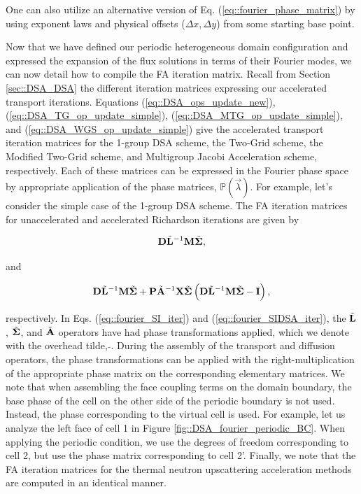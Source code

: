 \noindent One can also utilize an alternative version of Eq. (\ref{eq::fourier_phase_matrix}) by using exponent laws and physical offsets ($\Delta x, \Delta y$) from some starting base point.

Now that we have defined our periodic heterogeneous domain configuration and expressed the expansion of the flux solutions in terms of their Fourier modes, we can now detail how to compile the FA iteration matrix. Recall from Section \ref{sec::DSA_DSA} the different iteration matrices expressing our accelerated transport iterations. Equations (\ref{eq::DSA_ops_update_new}), (\ref{eq::DSA_TG_op_update_simple}), (\ref{eq::DSA_MTG_op_update_simple}), and (\ref{eq::DSA_WGS_op_update_simple}) give the accelerated transport iteration matrices for the 1-group DSA scheme, the Two-Grid scheme, the Modified Two-Grid scheme, and Multigroup Jacobi Acceleration scheme, respectively. Each of these matrices can be expressed in the Fourier phase space by appropriate application of the phase matrices, $\mathbb{P} (\vec{\lambda}) $. For example, let's consider the simple case of the 1-group DSA scheme. The FA iteration matrices for unaccelerated and accelerated Richardson iterations are given by

\begin{equation}
\label{eq::fourier_SI_iter}
{\bf D} \tilde{{\bf L}}^{-1} {\bf M} \tilde{{\bf \Sigma}} ,
\end{equation}

\noindent and

\begin{equation}
\label{eq::fourier_SIDSA_iter}
{\bf D} \tilde{{\bf L}}^{-1} {\bf M} \tilde{{\bf \Sigma}} + {\bf P } \tilde{{\bf A }}^{-1} {\bf X } \tilde{{\bf \Sigma }} \left( {\bf D} \tilde{{\bf L}}^{-1} {\bf M} \tilde{{\bf \Sigma}}  - {\bf I }  \right),
\end{equation}

\noindent respectively. In Eqs. (\ref{eq::fourier_SI_iter}) and (\ref{eq::fourier_SIDSA_iter}), the $\tilde{{\bf L}}$, $\tilde{{\bf \Sigma}}$, and $\tilde{{\bf A}}$ operators have had phase transformations applied, which we denote with the overhead tilde, $\tilde{}$. During the assembly of the transport and diffusion operators, the phase transformations can be applied with the right-multiplication of the appropriate phase matrix on the corresponding elementary matrices. We note that when assembling the face coupling terms on the domain boundary, the base phase of the cell on the other side of the periodic boundary is not used. Instead, the phase corresponding to the virtual cell is used. For example, let us analyze the left face of cell 1 in Figure \ref{fig::DSA_fourier_periodic_BC}. When applying the periodic condition, we use the degrees of freedom corresponding to cell 2, but use the phase matrix corresponding to cell 2'. Finally, we note that the FA iteration matrices for the thermal neutron upscattering acceleration methods are computed in an identical manner.

